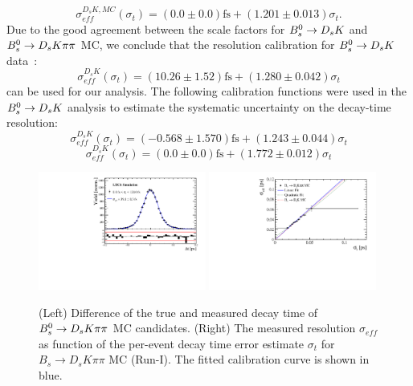 \begin{equation}
\sigma_{eff}^{D_sK,MC}(\sigma_t) = \left( 0.0 \pm 0.0 \right) \text{fs} + \left( 1.201 \pm 0.013 \right) \sigma_t  .
\label{eq:scaleFactorDsKMC}
\end{equation}
Due to the good agreement between the scale factors for  ${{B}^0_{s}}\rightarrow{\ensuremath{{D}_{s}}}{\ensuremath{K}}$ and ${{B}^0_{s}}\rightarrow{\ensuremath{{D}_{s}}}{\ensuremath{K}}{\ensuremath{\pi}}{\ensuremath{\pi}}$ MC, we conclude that 
the resolution calibration for ${{B}^0_{s}}\rightarrow{\ensuremath{{D}_{s}}}{\ensuremath{K}}$ data~\cite{Aaij:2017lff}:
\begin{equation}
\sigma_{eff}^{D_sK}(\sigma_t) = \left( 10.26 \pm 1.52 \right) \text{fs} + \left( 1.280 \pm 0.042 \right) \sigma_t
\label{eq:scaleFactorDsK}
\end{equation}
can be used for our analysis.
The following calibration functions were used in the ${{B}^0_{s}}\rightarrow{\ensuremath{{D}_{s}}}{\ensuremath{K}}$ analysis to estimate the systematic uncertainty on the decay-time resolution:
\begin{equation}
\sigma_{eff}^{D_sK}(\sigma_t) = \left( -0.568 \pm 1.570 \right) \text{fs} + \left( 1.243 \pm 0.044 \right) \sigma_t
\label{eq:scaleFactorDsK2}
\end{equation}
\begin{equation}
\sigma_{eff}^{D_sK}(\sigma_t) = \left( 0.0 \pm 0.0 \right) \text{fs} + \left( 1.772 \pm 0.012 \right) \sigma_t
\label{eq:scaleFactorDsK3}
\end{equation}


\begin{figure}[h]
\centering
\includegraphics[height=!,width=0.49\textwidth]{figs/Resolution/SignalMC_bin_all.pdf}
\includegraphics[height=!,width=0.49\textwidth]{figs/Resolution/ScaleFactor_MC.pdf}
\caption{ (Left) Difference of the true and measured decay time of ${{B}^0_{s}}\rightarrow{\ensuremath{{D}_{s}}}{\ensuremath{K}}{\ensuremath{\pi}}{\ensuremath{\pi}}$ MC candidates. 
(Right) The measured resolution $\sigma_{eff}$ as function of the per-event decay time error estimate $\sigma_t$ for $B_s \to D_s K \pi \pi$ MC (Run-I). 
The fitted calibration curve is shown in blue.}
\label{fig:scaleFactorMC}
\end{figure}

